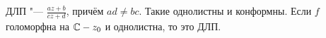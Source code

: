 \section{} %
	ДЛП "--- $\frac{az+b}{cz+d}$, причём $ad\neq bc$.
	Такие однолистны и конформны.
	Если $f$ голоморфна на $\mathbb{C}-z_0$ и однолистна, то это ДЛП.
	\TODO

\section{} %
	\TODO

\section{} %
	\TODO

\section{} %
	\TODO

\section{} %
	\TODO

\section{} %
	\TODO

\section{} %
	\TODO
